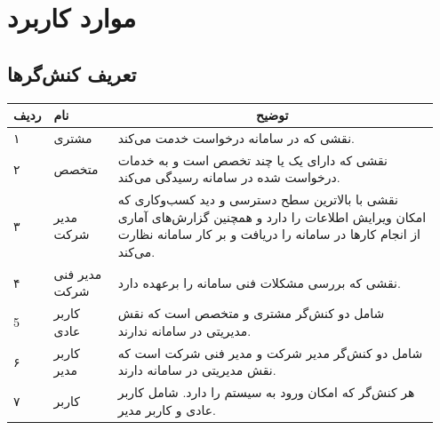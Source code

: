 
\chapter{موارد کاربرد}


\section{تعریف کنش‌گر‌ها}


\begin{table}[h]
	\setlength\extrarowheight{-5pt}
	\centering
	\begin{tabular}{|p{0.05\linewidth}|p{0.15\linewidth}|p{0.75\linewidth}|} 
\hline
\multicolumn{1}{|c|}{\textbf{ردیف}} & \textbf{نام}  & \multicolumn{1}{c|}{\textbf{توضیح}}                                                                                                                                  \\ \hline
۱                                   & مشتری         & نقشی که در سامانه درخواست خدمت می‌کند.                                                                                                                               \\ \hline
۲                                   & متخصص         & نقشی که دارای یک یا چند تخصص است و به خدمات درخواست شده در سامانه رسیدگی می‌کند.                                                                                     \\ \hline
۳                                   & مدیر شرکت     & نقشی با بالاترین سطح دسترسی و دید کسب‌و‌کاری که امکان ویرایش اطلاعات را دارد و همچنین گزارش‌های آماری از انجام کارها در سامانه را دریافت و بر کار سامانه نظارت می‌کند. \\ \hline
۴                                   & مدیر فنی شرکت & نقشی که بررسی مشکلات فنی سامانه را برعهده دارد.  
 \\ \hline
 
 5                                  & کاربر عادی         & شامل دو کنش‌گر مشتری و متخصص است که نقش مدیریتی در سامانه ندارند.\\ 
 \hline
 
 ۶                                  & کاربر مدیر         & شامل دو کنش‌گر مدیر شرکت و مدیر فنی شرکت است که نقش مدیریتی در سامانه دارند.\\ 
 \hline
 
۷                                  & کاربر         &  هر کنش‌گر که امکان ورود به سیستم را دارد. شامل کاربر عادی و کاربر مدیر.\\
 \hline
	\end{tabular}
\end{table}
\newpage
